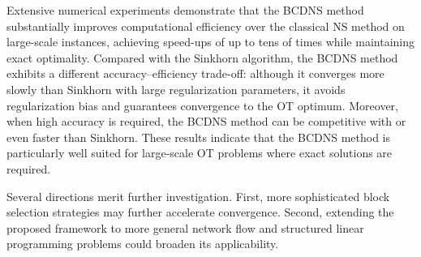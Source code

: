 \documentclass[12pt,a4paper]{article}
\begin{document}
Extensive numerical experiments demonstrate that the BCDNS method substantially improves computational efficiency
over the classical NS method on large-scale instances, achieving speed-ups of up to tens of times while
maintaining exact optimality.
Compared with the Sinkhorn algorithm, the BCDNS method exhibits a different accuracy--efficiency trade-off:
although it converges more slowly than Sinkhorn with large regularization parameters, it avoids
regularization bias and guarantees convergence to the OT optimum.
Moreover, when high accuracy is required, the BCDNS method can be competitive with or even faster than Sinkhorn.
These results indicate that the BCDNS method is particularly well suited for large-scale OT problems where exact solutions are required.

Several directions merit further investigation.
First, more sophisticated block selection strategies may further accelerate convergence.
Second, extending the proposed framework to more general network flow and structured linear programming
problems could broaden its applicability.








\printbibliography
\end{document}
